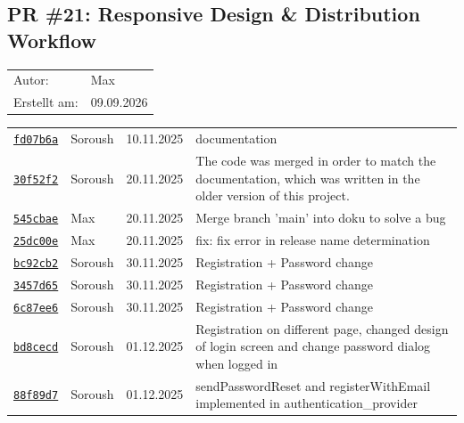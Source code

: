 \documentclass{article}%
\begin{document}
\subsection{PR \#21: Responsive Design \& Distribution Workflow}%
\label{pr:21}%
\begin{tabular}{l l}%
Autor:&Max\\%
Erstellt am: &09.09.2026\\%
\end{tabular}%
\begin{longtable}{l l l p{12cm}}%
\href{https://github.com/scriptor1000/homeworks/pull/21/commits/fd07b6a4f9ea2022fc1a6a9be3d26f1655277c4f}{\underline{\texttt{fd07b6a}}}&Soroush&10.11.2025&documentation\\%
\href{https://github.com/scriptor1000/homeworks/pull/21/commits/30f52f2b1bc13e1fe8ee55809fc031e9cc19017f}{\underline{\texttt{30f52f2}}}&Soroush&20.11.2025&The code was merged in order to match the documentation, which was written in the older version of this project.\\%
\href{https://github.com/scriptor1000/homeworks/pull/21/commits/545cbaee40893f7f2df79fbc5d13e4b224b9de9f}{\underline{\texttt{545cbae}}}&Max&20.11.2025&Merge branch 'main' into doku to solve a bug\\%
\href{https://github.com/scriptor1000/homeworks/pull/21/commits/25dc00e723674e876311d6195092dd384bd880d3}{\underline{\texttt{25dc00e}}}&Max&20.11.2025&fix: fix error in release name determination\\%
\href{https://github.com/scriptor1000/homeworks/pull/21/commits/bc92cb29ef32d5fe9fcf9f54254ddd614cb3bebe}{\underline{\texttt{bc92cb2}}}&Soroush&30.11.2025&Registration + Password change\\%
\href{https://github.com/scriptor1000/homeworks/pull/21/commits/3457d65b6ed5615bf84be5cd6e0b4f12a762f53d}{\underline{\texttt{3457d65}}}&Soroush&30.11.2025&Registration + Password change\\%
\href{https://github.com/scriptor1000/homeworks/pull/21/commits/6c87ee631105c16e138f039a21cc16ff7676ddd0}{\underline{\texttt{6c87ee6}}}&Soroush&30.11.2025&Registration + Password change\\%
\href{https://github.com/scriptor1000/homeworks/pull/21/commits/bd8cecda9492262b7ccbad0cbc24022890d14a78}{\underline{\texttt{bd8cecd}}}&Soroush&01.12.2025&Registration on different page, changed design of login screen and change password dialog when logged in\\%
\href{https://github.com/scriptor1000/homeworks/pull/21/commits/88f89d70003046286ad5d579bc28acef1e7a7c72}{\underline{\texttt{88f89d7}}}&Soroush&01.12.2025&sendPasswordReset and registerWithEmail implemented in authentication\_provider\\%

\end{longtable}
\end{document}
